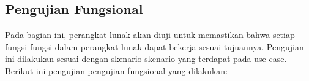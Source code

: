 
\subsection{Pengujian Fungsional}
Pada bagian ini, perangkat lunak akan diuji untuk memastikan bahwa setiap fungsi-fungsi dalam perangkat lunak dapat bekerja sesuai tujuannya. Pengujian ini dilakukan sesuai dengan skenario-skenario yang terdapat pada use case. Berikut ini pengujian-pengujian fungsional yang dilakukan:

